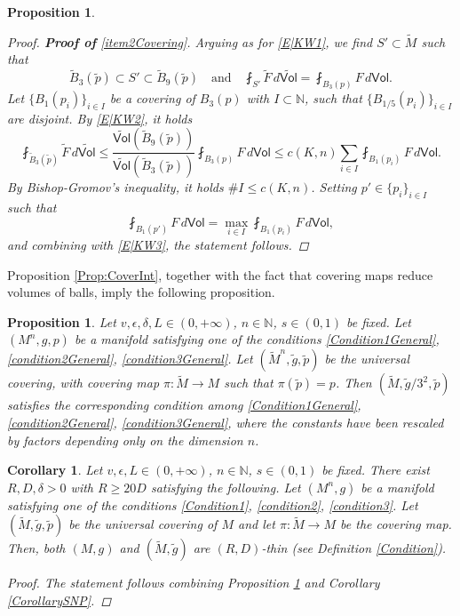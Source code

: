 \documentclass[10pt]{article}
\newtheorem{corollary}[thm]{Corollary}
\newtheorem{proposition}[thm]{Proposition}
\theoremstyle{definition}
\newcommand{\bb}[1]{\mathbb{#1}}
\newcommand{\ssf}[1]{\mathsf{#1}}
\begin{document}
\begin{proposition}
\begin{proof}
\textbf{Proof of }\ref{item2Covering}. Arguing as for \eqref{E|KW1}, we find $S' \subset \tilde{M}$ such that
\begin{equation} \label{E|KW2}
\tilde{B}_3(\tilde{p}) \subset S' \subset \tilde{B}_9(\tilde{p}) \quad \text{and} \quad
\fint_{S'} \tilde{F} \, d\widetilde{\ssf{Vol}}=\fint_{B_3(p)}F \, d\ssf{Vol}.
\end{equation}
Let $\{B_1(p_i)\}_{i \in I}$ be a covering of $B_3(p)$ with $I \subset \bb{N}$, such that $\{B_{1/5}(p_i)\}_{i \in I}$ are disjoint. By \eqref{E|KW2}, it holds
\begin{equation} \label{E|KW3}
\fint_{\tilde{B}_3(\tilde{p})} \tilde{F} \, d\widetilde{\ssf{Vol}} \leq 
\frac{\widetilde{\ssf{Vol}}(\tilde{B}_9(\tilde{p})) }{\widetilde{\ssf{Vol}}(\tilde{B}_3(\tilde{p}))}
\fint_{B_3(p)}F \, d\ssf{Vol} \leq
c(K,n) \sum_{i \in I} \fint_{B_1(p_i)}F \, d\ssf{Vol}.
\end{equation}
By Bishop-Gromov's inequality, it holds $\# I \leq c(K,n)$. Setting $p' \in \{p_i\}_{i \in I}$ such that
\[
\fint_{B_1(p')}F \, d\ssf{Vol}=\max_{i \in I}\fint_{B_1(p_i)}F \, d\ssf{Vol}, 
\]
and combining with \eqref{E|KW3}, the statement follows.
    \end{proof}
\end{proposition}

Proposition \ref{Prop:CoverInt}, together with the fact that covering maps reduce volumes of balls, imply the following proposition.

\begin{proposition} \label{PC3}
    Let $v,\epsilon,\delta,L \in (0,+\infty)$, $n \in \bb{N}$, $s \in (0,1)$ be fixed. Let $(M^n,g,p)$ be a manifold satisfying one of the conditions \eqref{Condition1General}, \eqref{condition2General}, \eqref{condition3General}. Let $(\tilde{M}^n,\tilde{g},\tilde{p})$ be the universal covering, with covering map $\pi:\tilde{M} \to M$ such that $\pi(\tilde{p})=p$. Then $(\tilde{M},\tilde{g}/3^2,\tilde{p})$ satisfies the corresponding condition among \eqref{Condition1General}, \eqref{condition2General}, \eqref{condition3General}, where the constants have been rescaled by factors depending only on the dimension $n$.
\end{proposition}

\begin{corollary} \label{CC4}
    Let $v,\epsilon,L \in (0,+\infty)$, $n \in \bb{N}$, $s \in (0,1)$ be fixed. There exist $R,D,\delta>0$ with $R \geq 20D$ satisfying the following. Let $(M^n,g)$ be a manifold satisfying one of the  conditions \eqref{Condition1}, \eqref{condition2}, \eqref{condition3}. Let $(\tilde{M},\tilde{g},\tilde{p})$ be the universal covering of $M$ and let $\pi:\tilde{M} \to M$ be the covering map. Then, both $(M,g)$ and $(\tilde{M},\tilde{g})$ are $(R,D)$-thin (see Definition \ref{Condition}).
    \begin{proof}
        The statement follows combining Proposition \ref{PC3} and Corollary \ref{CorollarySNP}.
    \end{proof}
\end{corollary}
\end{document}
